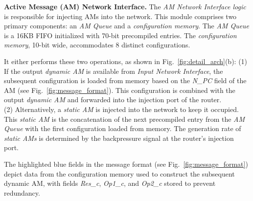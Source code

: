 \textbf{Active Message (AM) Network Interface.}
The \textit{AM Network Interface logic} is responsible for injecting AMs into the network.
This module comprises two primary components: an \textit{AM Queue} and a \textit{configuration memory}. 
The \textit{AM Queue} is a 16KB FIFO initialized with 70-bit precompiled entries. 
The \textit{configuration memory}, 10-bit wide, accommodates 8 distinct configurations.

It either performs these two operations, as shown in Fig.~\ref{fig:detail_arch}(b):
(1) If the output \textit{dynamic AM} is available from \textit{Input Network Interface}, the subsequent configuration is loaded from memory based on the \textit{N\_PC} field of the AM (see Fig.~\ref{fig:message_format}). 
This configuration is combined with the output \textit{dynamic AM} and forwarded into the injection port of the router.\\
(2) Alternatively, a \textit{static AM} is injected into the network to keep it occupied. 
This \textit{static AM} is the concatenation of the next precompiled entry from the \textit{AM Queue} with the first configuration loaded from memory.
The generation rate of \textit{static AMs} is determined by the backpressure signal at the router's injection port.

The highlighted blue fields in the message format (see Fig.~\ref{fig:message_format}) depict data from the configuration memory used to construct the subsequent dynamic AM, with fields \textit{Res\_c}, \textit{Op1\_c}, and \textit{Op2\_c} stored to prevent redundancy.



